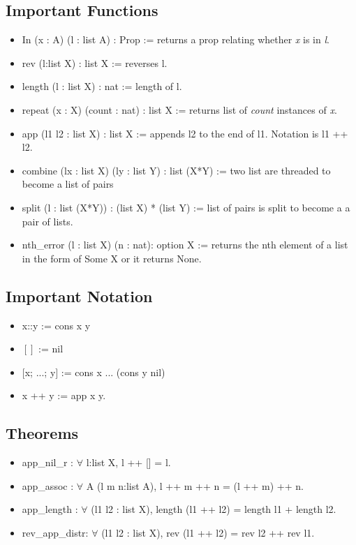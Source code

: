 \documentclass[12pt,a4paper]{article}
\theoremstyle{case}
\begin{document}
\subsection{Important Functions}
\begin{itemize}
    \item In (x : A) (l : list A) : Prop := returns a prop relating whether \textit{x} is in \textit{l}.
    \item rev (l:list X) : list X := reverses l. 
    \item length (l : list X) : nat := length of l. 
    \item repeat (x : X) (count : nat) : list X := returns list of \textit{count} instances of \textit{x}.
    \item app (l1 l2 : list X) : list X := appends l2 to the end of l1. Notation is l1 ++ l2. 
    \item combine (lx : list X) (ly : list Y) : list (X*Y) := two list are threaded to become a list of pairs
    \item split (l : list (X*Y)) : (list X) * (list Y) := list of pairs is split to become a a pair of lists. 
    \item nth\_error (l : list X) (n : nat): option X := returns the nth element of a list in the form of Some X or it returns None. 
\end{itemize}
\subsection{Important Notation}
\begin{itemize}
    \item x::y := cons x y 
    \item $[]$ := nil
    \item $[$x; ...; y$]$ := cons x ... (cons y nil)
    \item x ++ y := app x y. 
\end{itemize}
\subsection{Theorems}
\begin{itemize}
    \item app\_nil\_r : $\forall$ l:list X, l ++ [] = l.
    \item app\_assoc : $\forall$ A (l m n:list A), l ++ m ++ n = (l ++ m) ++ n.
    \item app\_length : $\forall$ (l1 l2 : list X), length (l1 ++ l2) = length l1 + length l2.
    \item rev\_app\_distr: $\forall$ (l1 l2 : list X), rev (l1 ++ l2) = rev l2 ++ rev l1.
\end{itemize}
\end{document}

